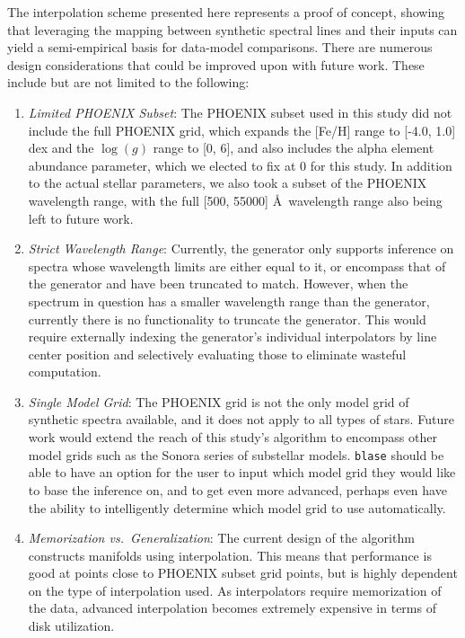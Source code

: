 \documentclass[twocolumn]{aastex631}
\begin{document}
The interpolation scheme presented here represents a proof of concept, showing that leveraging the mapping between synthetic spectral lines and their inputs can yield a semi-empirical basis for data-model comparisons. 
There are numerous design considerations that could be improved upon with future work. 
These include but are not limited to the following:
\begin{enumerate}[label=-]
    \item \textit{Limited PHOENIX Subset}: The PHOENIX subset used in this study did not include the full PHOENIX grid, which expands the [Fe/H] range to [-4.0, 1.0] dex and the $\log(g)$ range to [0, 6], and also includes the alpha element abundance parameter, which we elected to fix at 0 for this study. 
    In addition to the actual stellar parameters, we also took a subset of the PHOENIX wavelength range, with the full [500, 55000] \AA \ wavelength range also being left to future work.
    \item \textit{Strict Wavelength Range}: Currently, the generator only supports inference on spectra whose wavelength limits are either equal to it, or encompass that of the generator and have been truncated to match. 
    However, when the spectrum in question has a smaller wavelength range than the generator, currently there is no functionality to truncate the generator. 
    This would require externally indexing the generator's individual interpolators by line center position and selectively evaluating those to eliminate wasteful computation.
    \item \textit{Single Model Grid}: The PHOENIX grid is not the only model grid of synthetic spectra available, and it does not apply to all types of stars. 
    Future work would extend the reach of this study's algorithm to encompass other model grids such as the Sonora series of substellar models. 
    \texttt{blase} should be able to have an option for the user to input which model grid they would like to base the inference on, and to get even more advanced, perhaps even have the ability to intelligently determine which model grid to use automatically.
    \item \textit{Memorization vs.\ Generalization}: The current design of the algorithm constructs manifolds using interpolation. 
    This means that performance is good at points close to PHOENIX subset grid points, but is highly dependent on the type of interpolation used. 
    As interpolators require memorization of the data, advanced interpolation becomes extremely expensive in terms of disk utilization. 

\end{enumerate}
\end{document}
